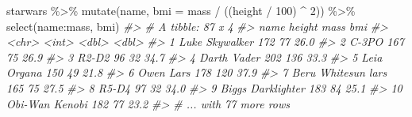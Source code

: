 \documentclass[
]{book}
\newenvironment{Shaded}{\begin{snugshade}}{\end{snugshade}}
\newcommand{\AttributeTok}[1]{\textcolor[rgb]{0.77,0.63,0.00}{#1}}
\newcommand{\CommentTok}[1]{\textcolor[rgb]{0.56,0.35,0.01}{\textit{#1}}}
\newcommand{\DecValTok}[1]{\textcolor[rgb]{0.00,0.00,0.81}{#1}}
\newcommand{\FunctionTok}[1]{\textcolor[rgb]{0.00,0.00,0.00}{#1}}
\newcommand{\NormalTok}[1]{#1}
\newcommand{\SpecialCharTok}[1]{\textcolor[rgb]{0.00,0.00,0.00}{#1}}
\begin{document}
\begin{Shaded}
\begin{Highlighting}[]
\NormalTok{starwars }\SpecialCharTok{\%\textgreater{}\%} 
  \FunctionTok{mutate}\NormalTok{(name, }\AttributeTok{bmi =}\NormalTok{ mass }\SpecialCharTok{/}\NormalTok{ ((height }\SpecialCharTok{/} \DecValTok{100}\NormalTok{)  }\SpecialCharTok{\^{}} \DecValTok{2}\NormalTok{)) }\SpecialCharTok{\%\textgreater{}\%}
  \FunctionTok{select}\NormalTok{(name}\SpecialCharTok{:}\NormalTok{mass, bmi)}
\CommentTok{\#\textgreater{} \# A tibble: 87 x 4}
\CommentTok{\#\textgreater{}    name               height  mass   bmi}
\CommentTok{\#\textgreater{}    \textless{}chr\textgreater{}               \textless{}int\textgreater{} \textless{}dbl\textgreater{} \textless{}dbl\textgreater{}}
\CommentTok{\#\textgreater{}  1 Luke Skywalker        172    77  26.0}
\CommentTok{\#\textgreater{}  2 C{-}3PO                 167    75  26.9}
\CommentTok{\#\textgreater{}  3 R2{-}D2                  96    32  34.7}
\CommentTok{\#\textgreater{}  4 Darth Vader           202   136  33.3}
\CommentTok{\#\textgreater{}  5 Leia Organa           150    49  21.8}
\CommentTok{\#\textgreater{}  6 Owen Lars             178   120  37.9}
\CommentTok{\#\textgreater{}  7 Beru Whitesun lars    165    75  27.5}
\CommentTok{\#\textgreater{}  8 R5{-}D4                  97    32  34.0}
\CommentTok{\#\textgreater{}  9 Biggs Darklighter     183    84  25.1}
\CommentTok{\#\textgreater{} 10 Obi{-}Wan Kenobi        182    77  23.2}
\CommentTok{\#\textgreater{} \# ... with 77 more rows}



\end{Highlighting}
\end{Shaded}
\end{document}
